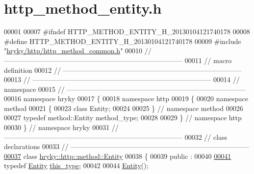 \hypertarget{http__method__entity_8h_source}{\section{http\-\_\-method\-\_\-entity.\-h}
}

\begin{DoxyCode}
00001 
00007 \textcolor{preprocessor}{#ifndef HTTP\_METHOD\_ENTITY\_H\_20130104121740178}
00008 \textcolor{preprocessor}{}\textcolor{preprocessor}{#define HTTP\_METHOD\_ENTITY\_H\_20130104121740178}
00009 \textcolor{preprocessor}{}\textcolor{preprocessor}{#include "\hyperlink{http__method__common_8h}{hryky/http/http_method_common.h}"}
00010 \textcolor{comment}{//
      ------------------------------------------------------------------------------}
00011 \textcolor{comment}{// macro definition}
00012 \textcolor{comment}{//
      ------------------------------------------------------------------------------}
00013 \textcolor{comment}{//
      ------------------------------------------------------------------------------}
00014 \textcolor{comment}{// namespace}
00015 \textcolor{comment}{//
      ------------------------------------------------------------------------------}
00016 \textcolor{keyword}{namespace }hryky
00017 \{
00018 \textcolor{keyword}{namespace }http
00019 \{
00020 \textcolor{keyword}{namespace }method
00021 \{
00023     \textcolor{keyword}{class }Entity;
00024 
00025 \} \textcolor{comment}{// namespace method}
00026 
00027 \textcolor{keyword}{typedef} method::Entity method\_type;
00028 
00029 \} \textcolor{comment}{// namespace http}
00030 \} \textcolor{comment}{// namespace hryky}
00031 \textcolor{comment}{//
      ------------------------------------------------------------------------------}
00032 \textcolor{comment}{// class declarations}
00033 \textcolor{comment}{//
      ------------------------------------------------------------------------------}
\hypertarget{http__method__entity_8h_source_l00037}{}\hyperlink{classhryky_1_1http_1_1method_1_1_entity}{00037} \textcolor{comment}{}\textcolor{keyword}{class }\hyperlink{classhryky_1_1http_1_1method_1_1_entity}{hryky::http::method::Entity}
00038 \{
00039 \textcolor{keyword}{public} :
00040 
\hypertarget{http__method__entity_8h_source_l00041}{}\hyperlink{classhryky_1_1http_1_1method_1_1_entity_a3953ff7f851afb4c64fde9ab521deb88}{00041}     \textcolor{keyword}{typedef} \hyperlink{classhryky_1_1http_1_1method_1_1_entity}{Entity} \hyperlink{classhryky_1_1http_1_1method_1_1_entity_a3953ff7f851afb4c64fde9ab521deb88}{this_type};
00042 
00044     \hyperlink{classhryky_1_1http_1_1method_1_1_entity_afc0427c309ca95105eeda86095bd7773}{Entity}();

\end{DoxyCode}
